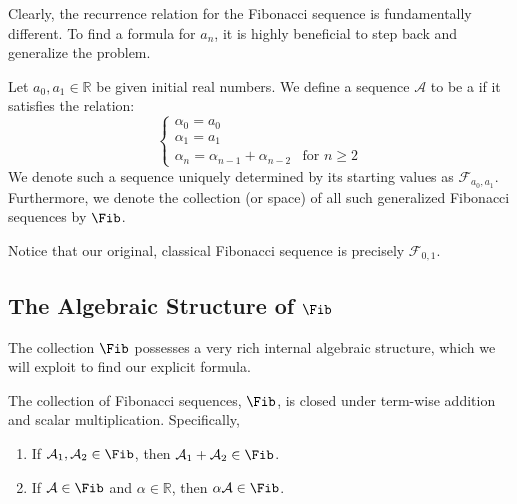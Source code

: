 Clearly, the recurrence relation for the Fibonacci sequence is fundamentally different. To find a formula for $a_n$, it is highly beneficial to step back and generalize the problem.

\begin{definition}
Let $a_0, a_1 \in \mathbb{R}$ be given initial real numbers. We define a sequence $\mathcal{A}$ to be a  if it satisfies the relation:
\begin{equation} \label{eq:generalized_fib_recurrence}
\begin{cases}
\alpha_0 = a_0 \\
\alpha_1 = a_1 \\
\alpha_n = \alpha_{n-1} + \alpha_{n-2} & \text{for } n \ge 2
\end{cases}
\end{equation}
We denote such a sequence uniquely determined by its starting values as $\mathcal{F}_{a_0, a_1}$. Furthermore, we denote the collection (or space) of all such generalized Fibonacci sequences by $\Fib$.
\end{definition}

Notice that our original, classical Fibonacci sequence is precisely $\mathcal{F}_{0, 1}$. 

\subsection{The Algebraic Structure of \texorpdfstring{$\Fib$}{Fib}}

The collection $\Fib$ possesses a very rich internal algebraic structure, which we will exploit to find our explicit formula.

\begin{proposition} \label{prop:fib_closure}
The collection of Fibonacci sequences, $\Fib$, is closed under term-wise addition and scalar multiplication. Specifically,
\begin{enumerate}
    \item If $\mathcal{A}_1, \mathcal{A}_2 \in \Fib$, then $\mathcal{A}_1 + \mathcal{A}_2 \in \Fib$.
    \item If $\mathcal{A} \in \Fib$ and $\alpha \in \mathbb{R}$, then $\alpha \mathcal{A} \in \Fib$.
\end{enumerate}
\end{proposition}

